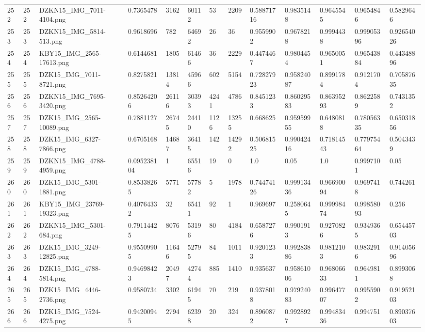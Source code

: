 \documentclass[11pt, a4paper, twoside]{report}
\begin{document}
\begin{longtable}[c]{@{}lllllllllllll@{}}
252 & 252 & DZKN15\_IMG\_7011-4104.png & 0.7365478 & 3162 & 60112 & 53 & 2209 & 0.58871716 & 0.9835148 & 0.9645545 & 0.9654846 & 0.5829646 \\
253 & 253 & DZKN15\_IMG\_5814-513.png & 0.9618696 & 782 & 64692 & 26 & 36 & 0.9559902 & 0.9678218 & 0.9994438 & 0.99905396 & 0.92654026 \\
254 & 254 & KBY15\_IMG\_2565-17613.png & 0.6144681 & 1805 & 61466 & 36 & 2229 & 0.4474467 & 0.9804454 & 0.9650051 & 0.96543884 & 0.44348896 \\
255 & 255 & DZK15\_IMG\_7011-8721.png & 0.8275821 & 13814 & 45966 & 602 & 5154 & 0.72827923 & 0.95824087 & 0.8991784 & 0.9121704 & 0.70587635 \\
256 & 256 & DZKN15\_IMG\_7695-3420.png & 0.85264206 & 26116 & 30393 & 4241 & 4786 & 0.8451233 & 0.86029583 & 0.86395293 & 0.8622589 & 0.7431352 \\
257 & 257 & DZK15\_IMG\_2565-10089.png & 0.7881127 & 26745 & 24410 & 1126 & 13255 & 0.668625 & 0.95959955 & 0.6480818 & 0.78056335 & 0.65031856 \\
258 & 258 & DZK15\_IMG\_6327-7866.png & 0.6705168 & 14687 & 36415 & 142 & 14292 & 0.50681525 & 0.99042416 & 0.71814543 & 0.77975464 & 0.5043439 \\
259 & 259 & DZKN15\_IMG\_4788-4959.png & 0.095238104 & 1 & 65516 & 19 & 0 & 1.0 & 0.05 & 1.0 & 0.9997101 & 0.05 \\
260 & 260 & DZK15\_IMG\_5301-1881.png & 0.85338265 & 5771 & 57782 & 5 & 1978 & 0.74474126 & 0.99913436 & 0.96690094 & 0.9697418 & 0.744261 \\
261 & 261 & KBY15\_IMG\_23769-19323.png & 0.40764332 & 32 & 65411 & 92 & 1 & 0.969697 & 0.2580645 & 0.99998474 & 0.99858093 & 0.256 \\
262 & 262 & DZKN15\_IMG\_5301-684.png & 0.79114425 & 8076 & 53196 & 80 & 4184 & 0.6587276 & 0.9901913 & 0.9270826 & 0.9349365 & 0.65445703 \\
263 & 263 & DZK15\_IMG\_3249-12825.png & 0.95509905 & 11646 & 52795 & 84 & 1011 & 0.9201233 & 0.99283886 & 0.9812103 & 0.9832916 & 0.91405696 \\
264 & 264 & DZK15\_IMG\_4788-5814.png & 0.94698423 & 20497 & 42744 & 885 & 1410 & 0.935637 & 0.95861006 & 0.96806633 & 0.9649811 & 0.8993068 \\
265 & 265 & DZK15\_IMG\_4446-2736.png & 0.9580734 & 3302 & 61945 & 70 & 219 & 0.9378018 & 0.97924083 & 0.99647707 & 0.9955902 & 0.91952103 \\
266 & 266 & DZK15\_IMG\_7524-4275.png & 0.94200945 & 2794 & 62398 & 20 & 324 & 0.8960872 & 0.9928927 & 0.99483436 & 0.994751 & 0.89037603 \\

\end{longtable}
\end{document}
